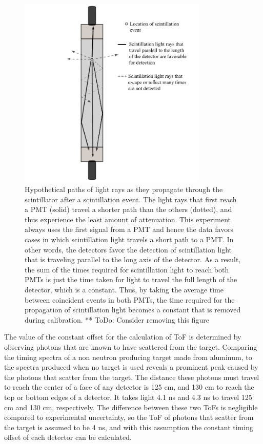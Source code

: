 \begin{figure}
    \centering
    \includegraphics[width = 0.8\textwidth]{Content/Methods/lightpaths.png}
    
    \caption{Hypothetical paths of light rays as they propagate through the scintillator after a scintillation event.
    The light rays that first reach a PMT (solid) travel a shorter path than the others (dotted), and thus experience the least amount of attenuation.
    This experiment always uses the first signal from a PMT and hence the data favors cases in which scintillation light travels a short path to a PMT.
    In other words, the detectors favor the detection of scintillation light that is traveling parallel to the long axis of the detector.
    As a result, the sum of the times required for scintillation light to reach both PMTs is just the time taken for light to travel the full length of the detector, which is a constant.
    Thus, by taking the average time between coincident events in both PMTs, the time required for the propagation of scintillation light becomes a constant that is removed during calibration.
    ** ToDo: Consider removing this figure  }
    \label{fig:lightpath}
\end{figure}

The value of the constant offset for the calculation of ToF is determined by observing photons that are known to have scattered from the target. Comparing the timing spectra of a non neutron producing target made from aluminum, to the spectra produced when no target is used reveals a prominent peak caused by the photons that scatter from the target. The distance these photons must travel to reach the center of a face of any detector is 125 cm, and 130 cm to reach the top or bottom edges of a detector. It takes light 4.1 ns and 4.3 ns to travel 125 cm and 130 cm, respectively. The difference between these two ToFs is negligible compared to experimental uncertainty, so the ToF of photons that scatter from the target is assumed to be 4 ns, and with this assumption the constant timing offset of each detector can be calculated.  
   
